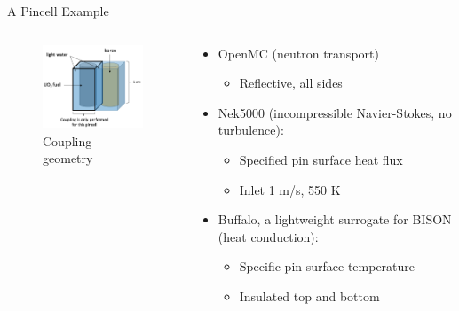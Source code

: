 \documentclass[10pt]{beamer}
\begin{document}
\begin{frame}{A Pincell Example}
\begin{columns}
\begin{column}{0.45\linewidth}
\begin{figure}
\includegraphics[width=5cm]{../Figures/pincell_picture.png}
\caption{Coupling geometry}
\end{figure}
\end{column}
\begin{column}{0.525\linewidth}
\begin{itemize}
\item OpenMC (neutron transport)
	\begin{itemize}
	\item Reflective, all sides\newline
	\end{itemize}
\item Nek5000 (incompressible Navier-Stokes, no turbulence):
	\begin{itemize}
	\item Specified pin surface heat flux
	\item Inlet 1 m/s, 550 K\newline
	\end{itemize}
\item Buffalo, a lightweight surrogate for BISON (heat conduction):
	\begin{itemize}
	\item Specific pin surface temperature
	\item Insulated top and bottom
	\end{itemize}
\end{itemize}
\end{column}
\end{columns}

\end{frame}
\end{document}

